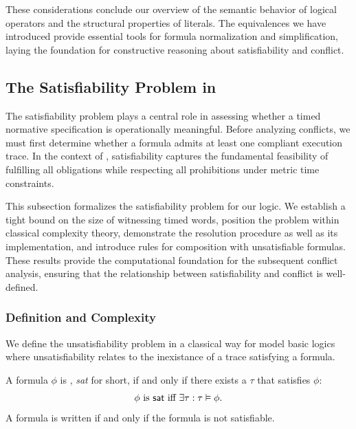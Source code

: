 These considerations conclude our overview of the semantic behavior of logical operators and the structural properties of literals. The equivalences we have introduced provide essential tools for formula normalization and simplification, laying the foundation for constructive reasoning about satisfiability and conflict.

\subsection{The Satisfiability Problem in \TDDLfm}
The satisfiability problem plays a central role in assessing whether a timed normative specification is operationally meaningful. Before analyzing conflicts, we must first determine whether a formula admits at least one compliant execution trace. In the context of \TDDLfm, satisfiability captures the fundamental feasibility of fulfilling all obligations while respecting all prohibitions under metric time constraints.

This subsection formalizes the satisfiability problem for our logic. We establish a tight bound on the size of witnessing timed words, position the problem within classical complexity theory, demonstrate the resolution procedure as well as its implementation, and introduce rules for composition with unsatisfiable formulas. These results provide the computational foundation for the subsequent conflict analysis, ensuring that the relationship between satisfiability and conflict is well-defined.
\subsubsection{Definition and Complexity}
We define the unsatisfiability problem in a classical way for model basic logics where unsatisfiability relates to the inexistance of a trace satisfying a formula. 
\begin{definition}[Satisfiability]\label{def:sat}
    A formula $\phi$ is , \emph{sat} for short, if and only if there exists a \timedword $\tau$ that  satisfies $\phi$:
    \[
    \phi \text{ is } \mathsf{sat}  \text{ iff } \exists \tau : \tau \vDash  \phi.
    \]
A formula is  written \unsat if and only if the formula is not satisfiable.
\end{definition}


